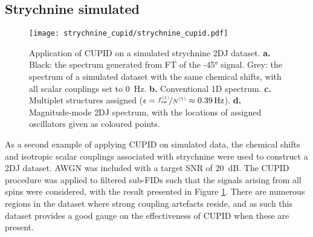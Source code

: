 
\subsection{Strychnine simulated}
\label{subsec:strychnine-cupid}
\begin{figure}
    \centering
    \texttt{[image: strychnine\_cupid/strychnine\_cupid.pdf]}
    \caption[
        Application of \acs{CUPID} on a simulated strychnine \acs{2DJ} dataset.
    ]
    {
        Application of \ac{CUPID} on a simulated strychnine \ac{2DJ} dataset.
        \textbf{a.} Black: the spectrum generated from \ac{FT} of the \ang{-45}
        signal. Grey: the spectrum of a simulated dataset with the same
        chemical shifts, with all scalar couplings set to \qty{0}{\hertz}.
        \textbf{b.} Conventional \ac{1D} spectrum.
        \textbf{c.} Multiplet structures assigned ($\epsilon =
        \nicefrac{\fswone}{\None} \approx \qty{0.39}{\hertz}$).
        \textbf{d.} Magnitude-mode \ac{2DJ} spectrum,
        with the locations of assigned oscillators given as coloured points.
    }
    \label{fig:strychnine-cupid}
\end{figure}
As a second example of applying \ac{CUPID} on simulated data, the chemical
shifts and isotropic scalar couplings associated with strychnine
were used to construct a 2DJ dataset. \ac{AWGN} was included with a target
\ac{SNR} of \qty{20}{\deci\bel}. The CUPID procedure was applied to filtered
sub-FIDs such that the signals arising from all spins were considered, with the
result presented in Figure \ref{fig:strychnine-cupid}. There are numerous
regions in the dataset where strong coupling artefacts reside, and as such this
dataset provides a good gauge on the effectiveness of \ac{CUPID} when these are
present.

